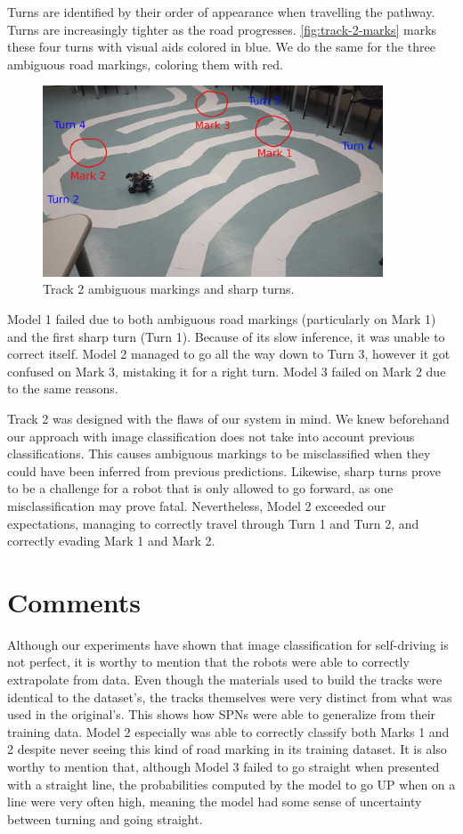 Turns are identified by their order of appearance when travelling the pathway. Turns are
increasingly tighter as the road progresses. \autoref{fig:track-2-marks} marks these four turns
with visual aids colored in blue. We do the same for the three ambiguous road markings, coloring
them with red.

\begin{figure}[h]
  \centering\includegraphics[width=0.9\textwidth]{imgs/track_2_marks.png}
  \caption{Track 2 ambiguous markings and sharp turns.\label{fig:track-2-marks}}
\end{figure}

Model 1 failed due to both ambiguous road markings (particularly on Mark 1) and the first sharp
turn (Turn 1). Because of its slow inference, it was unable to correct itself. Model 2 managed to
go all the way down to Turn 3, however it got confused on Mark 3, mistaking it for a right turn.
Model 3 failed on Mark 2 due to the same reasons.

Track 2 was designed with the flaws of our system in mind. We knew beforehand our approach with
image classification does not take into account previous classifications. This causes ambiguous
markings to be misclassified when they could have been inferred from previous predictions.
Likewise, sharp turns prove to be a challenge for a robot that is only allowed to go forward, as
one misclassification may prove fatal. Nevertheless, Model 2 exceeded our expectations, managing to
correctly travel through Turn 1 and Turn 2, and correctly evading Mark 1 and Mark 2.

\section{Comments}

Although our experiments have shown that image classification for self-driving is not perfect, it
is worthy to mention that the robots were able to correctly extrapolate from data. Even though the
materials used to build the tracks were identical to the dataset's, the tracks themselves were very
distinct from what was used in the original's. This shows how SPNs were able to generalize from
their training data. Model 2 especially was able to correctly classify both Marks 1 and 2 despite
never seeing this kind of road marking in its training dataset. It is also worthy to mention that,
although Model 3 failed to go straight when presented with a straight line, the probabilities
computed by the model to go UP when on a line were very often high, meaning the model had some
sense of uncertainty between turning and going straight.

